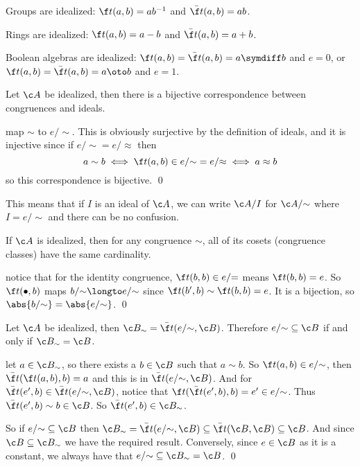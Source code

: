 \edefn

\blist
    \item Groups are idealized: $\f t(a,b)=ab^{-1}$ and $\bar{\f t}(a,b)=ab$.
    \item Rings are idealized: $\f t(a,b)=a-b$ and $\bar{\f t}(a,b)=a+b$.
    \item Boolean algebras are idealized: $\f t(a,b)=\bar{\f t}(a,b)=a\symdiff b$ and $e=0$, or $\f t(a,b)=\bar{\f t}(a,b)=a\oto b$ and $e=1$.
\elist

\bthrm

    Let $\c A$ be idealized, then there is a bijective correspondence between congruences and ideals.

\ethrm

\Proof map $\sim$ to $e/{\sim}$.
This is obviously surjective by the definition of ideals, and it is injective since if $e/{\sim}=e/{\approx}$ then
$$ a\sim b \iff \f t(a,b)\in e/{\sim} = e/{\approx} \iff a\approx b $$
so this correspondence is bijective.
\qed

This means that if $I$ is an ideal of $\c A$, we can write $\c A/I$ for $\c A/{\sim}$ where $I=e/{\sim}$ and there can be no confusion.

\bprop

    If $\c A$ is idealized, then for any congruence $\sim$, all of its cosets (congruence classes) have the same cardinality.

\eprop

\Proof notice that for the identity congruence, $\f t(b,b)\in e/{=}$ means $\f t(b,b)=e$.
So $\f t(\bullet,b)$ maps $b/{\sim}\longto e/{\sim}$ since $\f t(b',b)\sim\f t(b,b)=e$.
It is a bijection, so $\abs{b/{\sim}}=\abs{e/{\sim}}$.
\qed

\bthrm

    Let $\c A$ be idealized, then $\c B_\sim=\bar{\f t}(e/{\sim},\c B)$.
    Therefore $e/{\sim}\subseteq\c B$ if and only if $\c B_\sim=\c B$.

\ethrm

\Proof let $a\in\c B_\sim$, so there exists a $b\in\c B$ such that $a\sim b$.
So $\f t(a,b)\in e/{\sim}$, then $\bar{\f t}(\f t(a,b),b)=a$ and this is in $\bar{\f t}(e/{\sim},\c B)$.
And for $\bar{\f t}(e',b)\in\bar{\f t}(e/{\sim},\c B)$, notice that $\f t(\bar{\f t}(e',b),b)=e'\in e/{\sim}$.
Thus $\bar{\f t}(e',b)\sim b\in\c B$.
So $\bar{\f t}(e',b)\in\c B_\sim$.

So if $e/{\sim}\subseteq\c B$ then $\c B_\sim=\bar{\f t}(e/{\sim},\c B)\subseteq\bar{\f t}(\c B,\c B)\subseteq\c B$.
And since $\c B\subseteq\c B_\sim$ we have the required result.
Conversely, since $e\in\c B$ as it is a constant, we always have that $e/{\sim}\subseteq\c B_\sim=\c B$.
\qed

